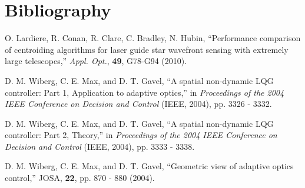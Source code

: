 
\newpage
\section{Bibliography}
\label{sec:biblio}

\begin{thebibliography}{}

O. Lardiere, R. Conan, R. Clare, C. Bradley, N. Hubin,
``Performance comparison of centroiding algorithms for laser guide star
wavefront sensing with extremely large telescopes,'' \emph{Appl. Opt.},
\textbf{49}, G78-G94 (2010).

D. M. Wiberg, C. E. Max, and D. T. Gavel, ``A spatial
non-dynamic LQG controller: Part 1, Application to
adaptive optics,'' in \emph{Proceedings of the 2004 IEEE
Conference on Decision and Control} (IEEE, 2004), pp.
3326 - 3332.

D. M. Wiberg, C. E. Max, and D. T. Gavel, ``A spatial
non-dynamic LQG controller: Part 2, Theory,'' in
\emph{Proceedings of the 2004 IEEE Conference on Decision and
Control} (IEEE, 2004), pp. 3333 - 3338.

D. M. Wiberg, C. E. Max, and D. T. Gavel, ``Geometric view of adaptive optics
control,'' JOSA, \textbf{22}, pp. 870 - 880 (2004).

\end{thebibliography}
